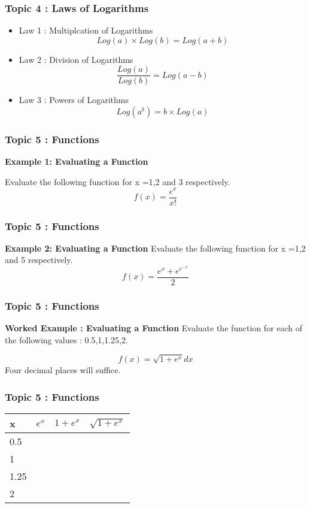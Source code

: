 \documentclass{beamer}
\begin{document}
\begin{frame}
	\frametitle{ Topic 4 : Laws of Logarithms}
	\Large
	\begin{itemize}
		\item Law 1 : Multiplcation of Logarithms
		\[ Log(a) \times Log(b) = Log(a+b) \]
		\item Law 2 : Division of Logarithms
		\[ \frac{Log(a)}{Log(b)} = Log(a-b) \]
		\item Law 3 : Powers of Logarithms
		\[ Log(a^b) = b \times Log(a) \]
	\end{itemize}
	
	
	
\end{frame}


\begin{frame}
		\frametitle{Topic 5 : Functions}
			\Large
	\noindent \textbf{Example 1: Evaluating a Function}

	Evaluate the following function for x =1,2 and 3 respectively.
	\[ f(x) = \frac{e^x}{x!} \]
\end{frame}
\begin{frame}
		\frametitle{Topic 5 : Functions}
		\Large
		\noindent \textbf{Example 2: Evaluating a Function}
	\Large
	Evaluate the following function for x =1,2 and 5 respectively.
	\[ f(x) = \frac{e^x + e^{e^{-x}}}{2} \]
\end{frame}
\begin{frame}
		\frametitle{Topic 5 : Functions}
		\Large
		\noindent \textbf{Worked Example : Evaluating a Function}
\Large
Evaluate the function for each of the following values : 0.5,1,1.25,2.

\[f(x) =  \sqrt{1+e^{x}} dx \]
 Four decimal places will suffice.
\end{frame}
\begin{frame}
			\frametitle{Topic 5 : Functions}
			\Large

	\LARGE
	\begin{center}
\begin{tabular}{|l||c|c|c|}
	\hline \rule[-2ex]{0pt}{5.5ex} x & $e^x$ & $1+e^x$ & $\sqrt{1+e^x}$ \\ \hline
	\hline \rule[-2ex]{0pt}{5.5ex} 0.5 & \phantom{spacesp}  &  &  \\ 
	\hline \rule[-2ex]{0pt}{5.5ex} 1 &  &  &  \\ 
	\hline \rule[-2ex]{0pt}{5.5ex} 1.25 & \phantom{spacesp}  &  &  \\ 
	\hline \rule[-2ex]{0pt}{5.5ex} 2 & \phantom{spacesp}  & \phantom{spacesp} & \phantom{spacesp}  \\ 
	\hline 
\end{tabular} 
 \end{center}
\end{frame}
\end{document}
